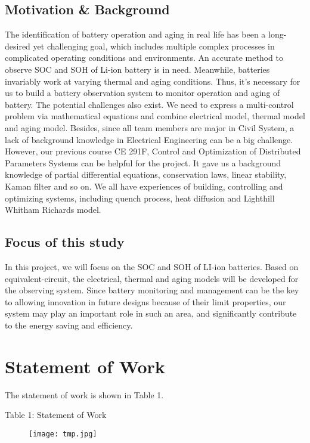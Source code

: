 \documentclass[12pt]{article}
\begin{document}
\subsection{Motivation \& Background}
The identification of battery operation and aging in real life has been a long-desired yet challenging goal, which includes multiple complex processes in complicated operating conditions and environments. An accurate method to observe SOC and SOH of Li-ion battery is in need. Meanwhile, batteries invariably work at varying thermal and aging conditions. Thus, it’s necessary for us to build a battery observation system to monitor operation and aging of battery. The potential challenges also exist. We need to express a multi-control problem via mathematical equations and combine electrical model, thermal model and aging model. Besides, since all team members are major in Civil System, a lack of background knowledge in Electrical Engineering can be a big challenge. However, our previous course CE 291F, Control and Optimization of Distributed Parameters Systems can be helpful for the project. It gave us a background knowledge of partial differential equations, conservation laws, linear stability, Kaman filter and so on. We all have experiences of building, controlling and optimizing systems, including quench process,  heat diffusion and Lighthill Whitham Richards model.
\subsection{Focus of this study}
In this project, we will focus on the SOC and SOH of LI-ion batteries. Based on equivalent-circuit, the electrical, thermal and aging models will be developed for the observing system. Since battery monitoring and management can be the key to allowing innovation in future designs because of their limit properties, our system may play an important role in such an area, and significantly contribute to the energy saving and efficiency. 
\newpage
\section{Statement of Work}
The statement of work is shown in Table 1.
\begin{center}
Table 1: Statement of Work
\end{center}
\vspace{-23pt}
\begin{figure}[H]
	\centering
	\texttt{[image: tmp.jpg]}      
\end{figure}
\newpage
\end{document}
